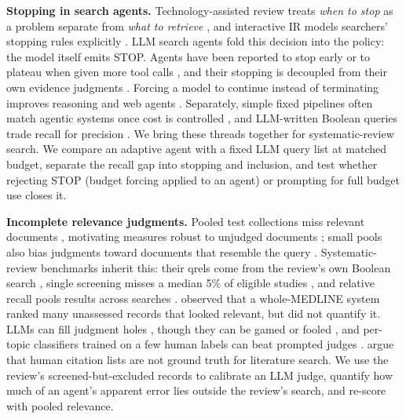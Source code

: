 \textbf{Stopping in search agents.}
Technology-assisted review treats \emph{when to stop} as a problem separate from \emph{what to retrieve}
\citep{cormack2016engineering,callaghan2020stopping,lewis2021certifying,stevenson2023pointprocess}, and
interactive IR models searchers' stopping rules explicitly \citep{maxwell2015searching,pirolli1999foraging}.
LLM search agents fold this decision into the policy: the model itself emits STOP. Agents have been reported
to stop early or to plateau when given more tool calls \citep{yen2025lost,liu2025budgetaware}, and their
stopping is decoupled from their own evidence judgments \citep{zhang2026judged}. Forcing a model to continue
instead of terminating improves reasoning \citep[budget forcing;][]{muennighoff2025s1} and web agents
\citep{shen2025thinking}. Separately, simple fixed pipelines often match agentic systems once cost is
controlled \citep{xia2024agentless,kapoor2024agents}, and LLM-written Boolean queries trade recall for
precision \citep{wang2025reassessing}. We bring these threads together for systematic-review search. We compare an
adaptive agent with a fixed LLM query list at matched budget, separate the recall gap into stopping and
inclusion, and test whether rejecting STOP (budget forcing applied to an agent) or prompting for full budget
use closes it.

\textbf{Incomplete relevance judgments.}
Pooled test collections miss relevant documents \citep{zobel1998reliable}, motivating measures robust to
unjudged documents \citep{buckley2004bpref,yilmaz2006infap,sakai2007bpref}; small pools also bias judgments
toward documents that resemble the query \citep{buckley2007bias}. Systematic-review benchmarks inherit this:
their qrels come from the review's own Boolean search \citep{kanoulas2017clef,scells2017testcollection},
single screening misses a median 5\% of eligible studies \citep{waffenschmidt2019single}, and relative recall
pools results across searches \citep{sampson2006relativerecall}. \citet{cormack2018clef} observed that a
whole-MEDLINE system ranked many unassessed records that looked relevant, but did not quantify it. LLMs can fill
judgment holes \citep{thomas2024llmjudge,upadhyay2024umbrela,upadhyay2024patch,abbasiantaeb2024holes}, though
they can be gamed or fooled \citep{clarke2024cantreplace,alaofi2024fooled,soboroff2025dontuse}, and per-topic
classifiers trained on a few human labels can beat prompted judges \citep{gienapp2025topicclassifiers}.
\citet{sahu2026rethinking} argue that human citation lists are not ground truth for literature search. We use
the review's screened-but-excluded records to calibrate an LLM judge, quantify how much of an agent's apparent
error lies outside the review's search, and re-score with pooled relevance.
